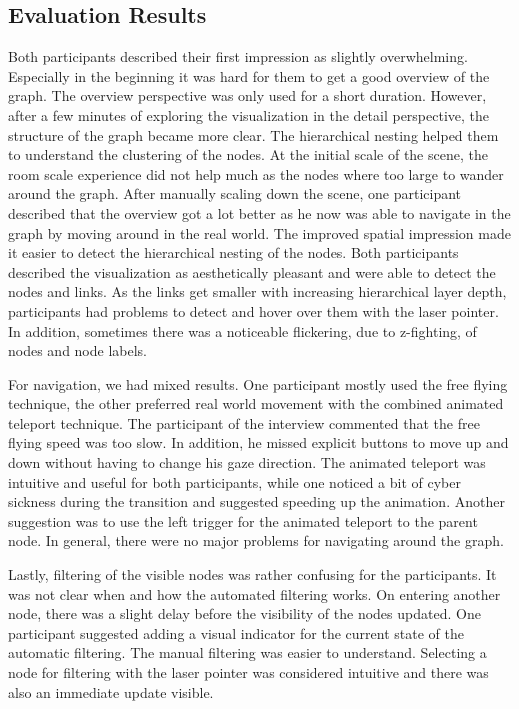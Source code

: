 \subsection{Evaluation Results}

Both participants described their first impression as slightly overwhelming.
Especially in the beginning it was hard for them to get a good overview of the graph. The overview perspective was only used for a short duration.
However, after a few minutes of exploring the visualization in the detail perspective, the structure of the graph became more clear.
The hierarchical nesting helped them to understand the clustering of the nodes.
At the initial scale of the scene, the room scale experience did not help much as the nodes where too large to wander around the graph. 
After manually scaling down the scene, one participant described that the overview got a lot better as he now was able to navigate in the graph by moving around in the real world. 
The improved spatial impression made it easier to detect the hierarchical nesting of the nodes.
Both participants described the visualization as aesthetically pleasant and were able to detect the nodes and links. As the links get smaller with increasing hierarchical layer depth, participants had problems to detect and hover over them with the laser pointer.
In addition, sometimes there was a noticeable flickering, due to z-fighting, of nodes and node labels.  

For navigation, we had mixed results. One participant mostly used the free flying technique, the other preferred real world movement with the combined animated teleport technique.
The participant of the interview commented that the free flying speed was too slow. In addition, he missed explicit buttons to move up and down without having to change his gaze direction.
The animated teleport was intuitive and useful for both participants, while one noticed a bit of cyber sickness during the transition and suggested speeding up the animation. Another suggestion was to use the left trigger for the animated teleport to the parent node.
In general, there were no major problems for navigating around the graph. 

Lastly, filtering of the visible nodes was rather confusing for the participants. It was not clear when and how the automated filtering works. On entering another node, there was a slight delay before the visibility of the nodes updated.
One participant suggested adding a visual indicator for the current state of the automatic filtering.
The manual filtering was easier to understand. Selecting a node for filtering with the laser pointer was considered intuitive and there was also an immediate update visible.

